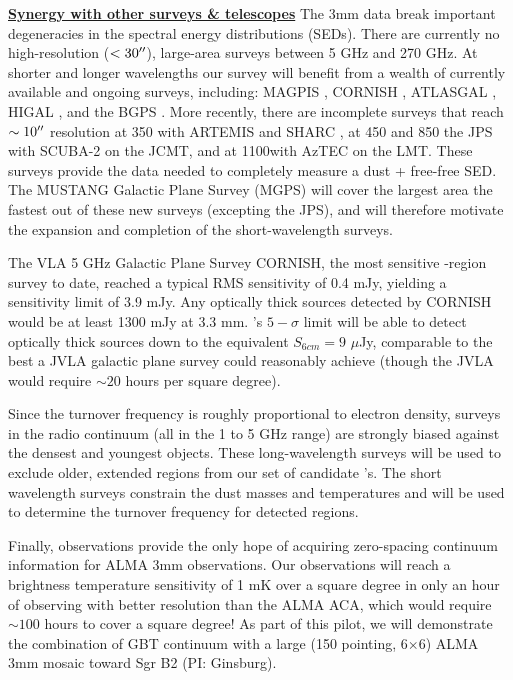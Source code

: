 \indent\underline{\textbf{\helv Synergy with other surveys \& telescopes}} 
The 3mm data break important degeneracies in the spectral energy distributions
(SEDs). There are currently no high-resolution ($<30\mbox{$^{\prime\prime}$}$), large-area
surveys between 5 GHz and 270 GHz.  At shorter and longer wavelengths our
survey will benefit from a wealth of currently available and ongoing surveys,
including: MAGPIS \citep{Helfand2006a}, CORNISH \citep{Hoare2012a}, ATLASGAL
\citep{Schuller2009a},  HIGAL \citep{Molinari2010a}, and the BGPS
\citep[][]{Aguirre2011a,Ginsburg2013a}.  More recently, there are incomplete
surveys that reach $\sim10\mbox{$^{\prime\prime}$}$ resolution at 350 \um with ARTEMIS and SHARC
\citep[e.g.][]{Lin2016a}, at 450 and 850 \um the JPS with SCUBA-2 on the JCMT,
and at 1100\um with AzTEC on the LMT. These surveys provide the data needed to
completely measure a dust + free-free SED.  The MUSTANG Galactic Plane Survey
(MGPS) will cover the largest area the fastest out of these new surveys
(excepting the JPS), and will therefore motivate the expansion and completion
of the short-wavelength surveys.

The VLA 5 GHz Galactic Plane Survey CORNISH, the most sensitive \uchii-region
survey to date, reached a typical RMS sensitivity of 0.4 mJy, yielding a
sensitivity limit of 3.9 mJy.  Any optically thick sources detected by CORNISH
would be at least 1300 mJy at 3.3 mm.  \MUSTANG’s $5-\sigma$ limit will be able
to detect optically thick sources down to the equivalent $S_{6cm} = 9$ $\mu$Jy,
comparable to the best a JVLA galactic plane survey could reasonably achieve
(though the JVLA would require $\sim20$ hours per square degree).


Since the turnover frequency is roughly proportional to electron density,
surveys in the radio continuum (all in the 1 to 5 GHz range) are strongly
biased against the densest and youngest objects.  These long-wavelength surveys
will be used to exclude older, extended \uchii regions from our set of
candidate \hchii's.  The short wavelength surveys constrain the dust masses and
temperatures and will be used to determine the turnover frequency for detected
\hchii regions.

Finally, \MUSTANG observations provide the only hope of acquiring zero-spacing
continuum information for ALMA 3mm observations.  Our observations will reach a
brightness temperature sensitivity of 1 mK over a square degree in only an hour
of observing with better resolution than the ALMA ACA, which would require
$\sim100$ hours to cover a square degree!  As part of this pilot, we will
demonstrate the combination of GBT continuum with a large (150 pointing,
6\arcmin$\times$6\arcmin) ALMA 3mm mosaic toward Sgr B2 (PI: Ginsburg).

